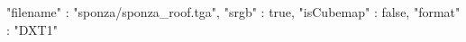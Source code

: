 { 
	"filename" : "sponza/sponza_roof.tga", 
	"srgb" : true,
	"isCubemap" : false,
	"format" : "DXT1"
}